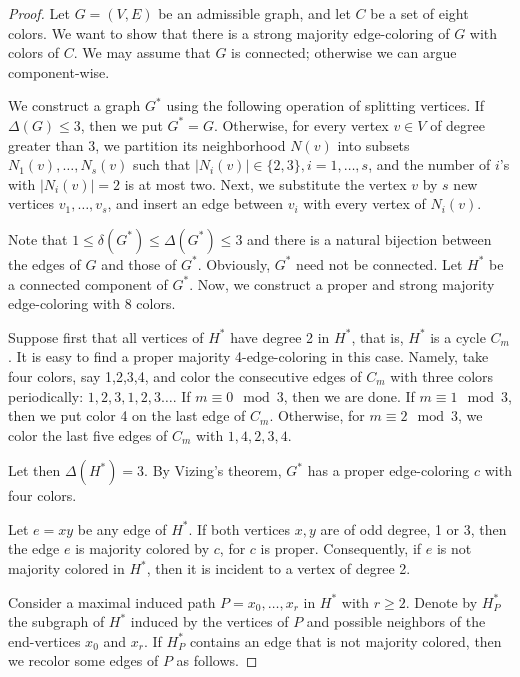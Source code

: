 \documentclass[11pt]{article}
\begin{document}
\begin{proof} Let $G=(V,E)$ be an admissible graph, and let $C$ be a set of eight colors. We want to show that there is a strong majority edge-coloring of $G$ with  colors of $C$. We may assume that $G$ is connected; otherwise we can argue component-wise.

We construct a graph $G^*$ using the following operation of splitting vertices. If $\Delta(G)\le 3$, then we put  $G^*=G$.  Otherwise, for every vertex $v\in V$  of degree greater than 3, we partition its neighborhood $N(v)$ into subsets $N_1(v),\ldots,N_s(v)$ such that $|N_i(v)|\in \{2,3\}, i=1,\ldots,s$, and the number of $i$'s with $|N_i(v)|=2$ is at most two. Next, we substitute the vertex $v$ by $s$ new vertices $v_1,\ldots,v_s$, and insert an edge between $v_i$ with every vertex of $N_i(v)$.  

Note that $1\le \delta(G^*)\le\Delta(G^*)\leq 3$ and there is a natural bijection between the edges of $G$ and those of $G^*$.  Obviously, $G^*$ need not be connected. Let $H^*$ be a connected component of $G^*$. Now, we construct a proper and strong majority edge-coloring with 8 colors. 

Suppose first that all vertices of $H^*$ have degree 2 in $H^*$, that is, $H^*$ is a cycle $C_m$. It is easy to find a proper majority 4-edge-coloring in this case. Namely, take four colors, say 1,2,3,4, and color the consecutive edges of $C_m$ with three colors periodically: $1,2,3,1,2,3\ldots$. If $m\equiv 0\mod 3$, then we are done. If $m\equiv 1 \mod 3$, then we put color 4 on the last edge of $C_m$. Otherwise, for $m\equiv 2 \mod 3$, we color the last five  edges of $C_m$ with $1,4,2,3,4$.   
 
Let then $\Delta(H^*)=3$. By Vizing's theorem, $G^*$ has a proper edge-coloring $c$ with four colors. 

Let $e=xy$ be any edge of $H^*$. If both vertices $x,y$ are of odd degree, 1 or 3, then the edge $e$ is majority colored by $c$, for $c$ is proper. Consequently, if $e$ is not majority colored in $H^*$, then it is incident to a vertex of degree 2. 

Consider a maximal induced path $P=x_0,\ldots,x_r$ in $H^*$ with $r\ge 2$. Denote by $H^*_P$ the subgraph of $H^*$ induced by the vertices of $P$ and possible neighbors of the end-vertices $x_0$ and $x_r$. If $H^*_P$ contains an edge that is not majority colored, then we recolor some edges of $P$ as follows.


\end{proof}
\end{document}
